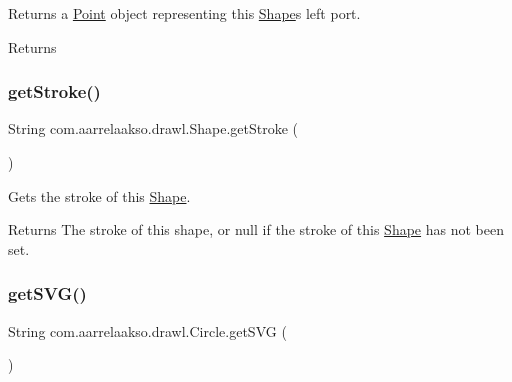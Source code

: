 Returns a \hyperlink{classcom_1_1aarrelaakso_1_1drawl_1_1_point}{Point} object representing this \hyperlink{classcom_1_1aarrelaakso_1_1drawl_1_1_shape}{Shape}\textquotesingle{}s left port. 

\begin{DoxyReturn}{Returns}

\end{DoxyReturn}
\mbox{\label{classcom_1_1aarrelaakso_1_1drawl_1_1_shape_a4e1d54c7e161e3af5053939ddefdf9e6}} 
\subsubsection{\texorpdfstring{get\+Stroke()}{getStroke()}}
{\footnotesize\ttfamily String com.\+aarrelaakso.\+drawl.\+Shape.\+get\+Stroke (\begin{DoxyParamCaption}{ }\end{DoxyParamCaption})\hspace{0.3cm}{\ttfamily [inherited]}}



Gets the stroke of this \hyperlink{classcom_1_1aarrelaakso_1_1drawl_1_1_shape}{Shape}. 

\begin{DoxyReturn}{Returns}
The stroke of this shape, or null if the stroke of this \hyperlink{classcom_1_1aarrelaakso_1_1drawl_1_1_shape}{Shape} has not been set. 
\end{DoxyReturn}
\mbox{\label{classcom_1_1aarrelaakso_1_1drawl_1_1_circle_adc826cc2d93eb4e78318035c86d00f03}} 
\subsubsection{\texorpdfstring{get\+S\+V\+G()}{getSVG()}}
{\footnotesize\ttfamily String com.\+aarrelaakso.\+drawl.\+Circle.\+get\+S\+VG (\begin{DoxyParamCaption}{ }\end{DoxyParamCaption})}



